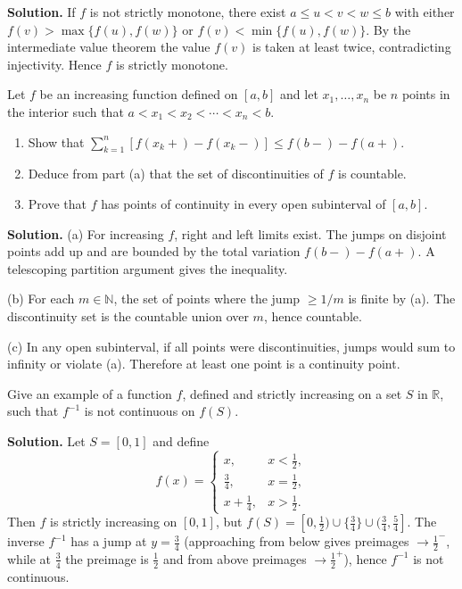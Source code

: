 \noindent\textbf{Solution.}
If $f$ is not strictly monotone, there exist $a\le u<v<w\le b$ with either $f(v)>\max\{f(u),f(w)\}$ or $f(v)<\min\{f(u),f(w)\}$. By the intermediate value theorem the value $f(v)$ is taken at least twice, contradicting injectivity. Hence $f$ is strictly monotone.
\medskip

\begin{problembox}
Let $f$ be an increasing function defined on $[a, b]$ and let $x_1, \ldots, x_n$ be $n$ points in the interior such that $a < x_1 < x_2 < \cdots < x_n < b$.
\begin{enumerate}[label=(\alph*)]
\item Show that $\sum_{k=1}^n [f(x_k+) - f(x_k-)] \leq f(b-) - f(a+)$.
\item Deduce from part (a) that the set of discontinuities of $f$ is countable.
\item Prove that $f$ has points of continuity in every open subinterval of $[a, b]$.
\end{enumerate}
\end{problembox}

\noindent\textbf{Solution.}
(a) For increasing $f$, right and left limits exist. The jumps on disjoint points add up and are bounded by the total variation $f(b-)-f(a+)$. A telescoping partition argument gives the inequality.

(b) For each $m\in\mathbb{N}$, the set of points where the jump $\ge 1/m$ is finite by (a). The discontinuity set is the countable union over $m$, hence countable.

(c) In any open subinterval, if all points were discontinuities, jumps would sum to infinity or violate (a). Therefore at least one point is a continuity point.
\medskip

\begin{problembox}
Give an example of a function $f$, defined and strictly increasing on a set $S$ in $\mathbb{R}$, such that $f^{-1}$ is not continuous on $f(S)$.
\end{problembox}

\noindent\textbf{Solution.}
Let $S=[0,1]$ and define
\[
f(x)=\begin{cases}
x,& x<\tfrac12,\\
\tfrac34,& x=\tfrac12,\\
x+\tfrac14,& x>\tfrac12.
\end{cases}
\]
Then $f$ is strictly increasing on $[0,1]$, but $f(S)=[0,\tfrac12)\cup\{\tfrac34\}\cup(\tfrac34,\tfrac54]$. The inverse $f^{-1}$ has a jump at $y=\tfrac34$ (approaching from below gives preimages $\to\tfrac12^-$, while at $\tfrac34$ the preimage is $\tfrac12$ and from above preimages $\to\tfrac12^+$), hence $f^{-1}$ is not continuous.
\medskip

